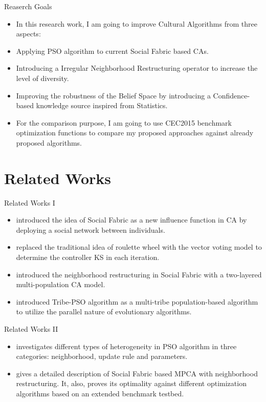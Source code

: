 \documentclass[table]{beamer}
\begin{document}
	\begin{frame}{Reaserch Goals}
		\begin{block}{}
			\begin{itemize}
				\justifying
				\item In this research work, I am going to improve Cultural Algorithms from three aspects:
				\item Applying PSO algorithm to current Social Fabric based CAs.
				\item Introducing a Irregular Neighborhood Restructuring operator to increase the level of diversity.
				\item Improving the robustness of the Belief Space by introducing a Confidence-based knowledge source inspired from Statistics.
				\item For the comparison purpose, I am going to use CEC2015 benchmark optimization functions to compare my proposed approaches against already proposed algorithms.
			\end{itemize}
		\end{block}
	\end{frame}
	
	\section{Related Works}
	
	\begin{frame}{Related Works I}
			\begin{itemize}
				\justifying
				\item \cite{R:1} introduced the idea of Social Fabric as a new influence function in CA by deploying a social network between individuals.
				\item \cite{che2010robust} replaced the traditional idea of roulette wheel with the vector voting model to determine the controller KS in each iteration.
				\item \cite{ali2012socio} introduced the neighborhood restructuring in Social Fabric with a two-layered multi-population CA model.
				\item \cite{chen2006tribe} introduced Tribe-PSO algorithm as a multi-tribe population-based algorithm to utilize the parallel nature of evolutionary algorithms.
			\end{itemize}
	\end{frame}
	
	\begin{frame}{Related Works II}
		\begin{itemize}
			\justifying
			\item \cite{de2009heterogeneous} investigates different types of heterogeneity in PSO algorithm in three categories: neighborhood, update rule and parameters.
			\item \cite{ali2016leveraged} gives a detailed description of Social Fabric based MPCA with neighborhood restructuring. It, also, proves its optimality against different optimization algorithms based on an extended benchmark testbed.
		\end{itemize}
	\end{frame}
	
\end{document}
